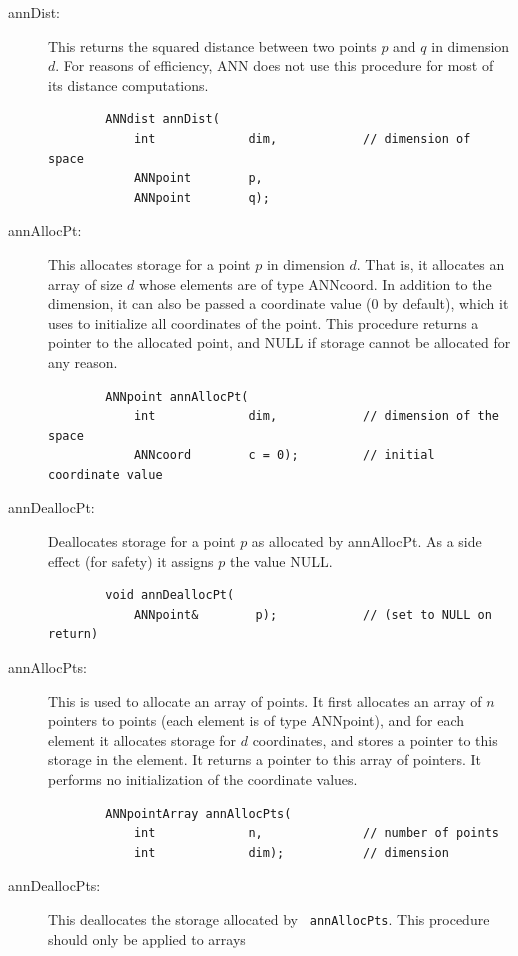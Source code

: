 \documentclass[11pt]{article}		%
\newcommand{\ANN}[0]{\textsf{ANN}}
\begin{document}
\begin{description}
\item[annDist:] This returns the squared distance between two points
	$p$ and $q$ in dimension $d$.  For reasons of efficiency, {\ANN}
	does not use this procedure for most of its distance computations.
	{\small \begin{verbatim}
	    ANNdist annDist(
	        int             dim,            // dimension of space
	        ANNpoint        p,
	        ANNpoint        q);
	\end{verbatim} }
\item[annAllocPt:] This allocates storage for a point $p$ in dimension
	$d$.  That is, it allocates an array of size $d$ whose elements are
	of type \textsf{ANNcoord}.  In addition to the dimension, it can
	also be passed a coordinate value (0 by default), which it uses to
	initialize all coordinates of the point.  This procedure returns a
	pointer to the allocated point, and \textsf{NULL} if storage cannot
	be allocated for any reason.
	{\small \begin{verbatim}
	    ANNpoint annAllocPt(
	        int             dim,            // dimension of the space
	        ANNcoord        c = 0);         // initial coordinate value
	\end{verbatim} }
\item[annDeallocPt:] Deallocates storage for a point $p$ as allocated by
	\textsf{annAllocPt}.  As a side effect (for safety) it assigns $p$
	the value \textsf{NULL}.
	{\small \begin{verbatim}
	    void annDeallocPt(
	        ANNpoint&        p);            // (set to NULL on return)
	\end{verbatim} }
\item[annAllocPts:]
	This is used to allocate an array of points.  It first allocates an
	array of $n$ pointers to points (each element is of type
	\textsf{ANNpoint}), and for each element it allocates storage for
	$d$ coordinates, and stores a pointer to this storage in the
	element.  It returns a pointer to this array of pointers.
	It performs no initialization of the coordinate values.
	{\small \begin{verbatim}
	    ANNpointArray annAllocPts(
	        int             n,              // number of points
	        int             dim);           // dimension
	\end{verbatim} }
\item[annDeallocPts:] This deallocates the storage allocated by {\tt
	annAllocPts}.  This procedure should only be applied to arrays

\end{description}
\end{document}
